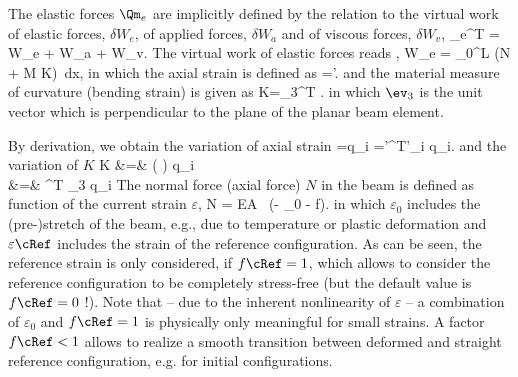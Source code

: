     The elastic forces $\Qm_e$ are implicitly defined by the relation to the 
    virtual work of elastic forces, $\delta W_e$, of applied forces, $\delta W_a$ and of viscous forces, $\delta W_v$, 
    \be \label{eq:cable2D:elasticForces}
      \Qm_e^T \delta \qv = \delta W_e + \delta W_a + \delta W_v.
    \ee
    The virtual work of elastic forces reads \cite{GerstmayrIrschik2008},
    \be
      \delta W_e = \int_0^L (N \delta \varepsilon + M \delta K) \,dx,
    \ee
    in which the axial strain is defined as \cite{GerstmayrIrschik2008}
    \be
      \varepsilon=\Vert \rv'.
    \ee 
    and the material measure of curvature (bending strain) is given as
    \be
    	K=\ev_3^T  .
    \ee
    in which $\ev_3$ is the unit vector which is perpendicular to the plane of the planar beam element.
    
    By derivation, we obtain the variation of axial strain
    \be \label{eq:cable2D:deltaEpsilon}
    \delta \varepsilon =\delta q_i
    	=\rv'^{T}\Sm'_i \delta q_i.
    \ee
    and the variation of $K$
    \bea \label{eq:cable2D:deltaKappa}
    \delta K &=&  \left( \right) \delta q_i\nonumber\\
       &=&  ^{T} \ev_3 \delta q_i
    \eea
    The normal force (axial force) $N$ in the beam is defined as function of the current strain $\varepsilon$,
    \be \label{eq_N}
      N = EA \, (\varepsilon - \varepsilon_0 - f\cRef \cdot \varepsilon\cRef).
    \ee
    in which $\varepsilon_0$ includes the (pre-)stretch of the beam, e.g., due to temperature or plastic deformation and 
    $\varepsilon\cRef$ includes the strain of the reference configuration.
    As can be seen, the reference strain is only considered, if $f\cRef=1$, which allows to consider the reference configuration to be
    completely stress-free (but the default value is $f\cRef=0$ !).
    Note that -- due to the inherent nonlinearity of $\varepsilon$ -- a combination of $\varepsilon_0$ and $f\cRef=1$ is physically only meaningful for small strains.
    A factor $f\cRef<1$ allows to realize a smooth transition between deformed and straight reference configuration, e.g. for initial configurations.

